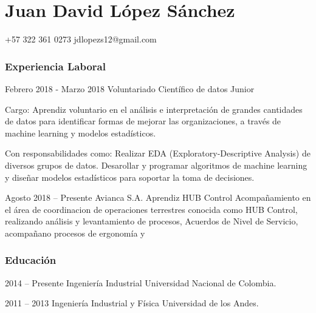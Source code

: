 \documentclass{tccv}
\begin{document}
\part{Juan David López Sánchez}


    {+57 322 361 0273}
    {jdlopezs12@gmail.com}


\section{Experiencia Laboral}

\vspace{10pt}

\begin{eventlist}

\item{Febrero 2018 - Marzo 2018}
     {Voluntariado}
     {Científico de datos Junior}

Cargo: Aprendiz voluntario en el análisis e interpretación de grandes cantidades de datos para identificar formas de mejorar las organizaciones, a través de machine learning y modelos estadísticos.\hfill 

Con responsabilidades como: \newline Realizar EDA (Exploratory-Descriptive Analysis) de diversos grupos de datos. Desarollar y programar algoritmos de machine learning y diseñar modelos estadísticos para soportar la toma de decisiones. 

\vspace{10pt}
\item{Agosto 2018 -- Presente}
     {Avianca S.A.}
     {Aprendiz HUB Control}
Acompañamiento en el área de coordinacion de operaciones terrestres conocida como HUB Control, realizando análisis y  levantamiento de procesos, Acuerdos de Nivel de Servicio, acompañano procesos de ergonomía y 
\end{eventlist}
\vspace{6pt}
\section{Educación}

\begin{yearlist}
\item{2014 -- Presente}
     {Ingeniería Industrial}
     {Universidad Nacional de Colombia.}

\item{2011 -- 2013}
     {Ingeniería Industrial y Física}
     {Universidad de  los \newline Andes.}


\end{yearlist}
\vfill\null
\columnbreak
\end{document}
